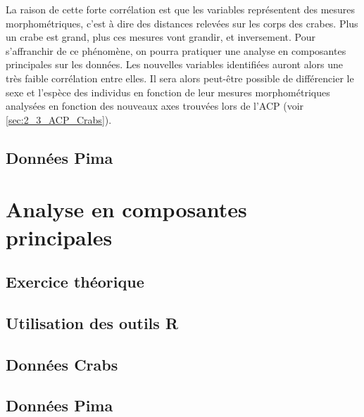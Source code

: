 \documentclass[a4paper,11pt]{report}
\begin{document}
La raison de cette forte corrélation est que les variables représentent des mesures morphométriques, c'est à dire des distances relevées sur les corps des crabes. Plus un crabe est grand, plus ces mesures vont grandir, et inversement.
Pour s'affranchir de ce phénomène, on pourra pratiquer une analyse en composantes principales sur les données. Les nouvelles variables identifiées auront alors une très faible corrélation entre elles. Il sera alors peut-être possible de différencier le sexe et l'espèce des individus en fonction de leur mesures morphométriques analysées en fonction des nouveaux axes trouvées lors de l'ACP (voir \autoref{sec:2_3_ACP_Crabs}).


\section{Données Pima}




\chapter{Analyse en composantes principales}


\section{Exercice théorique}


\section{Utilisation des outils R}


\section{Données Crabs}
\label{sec:2_3_ACP_Crabs}

\section{Données Pima}
\label{sec:2_4_ACP_Pima}
\end{document}
